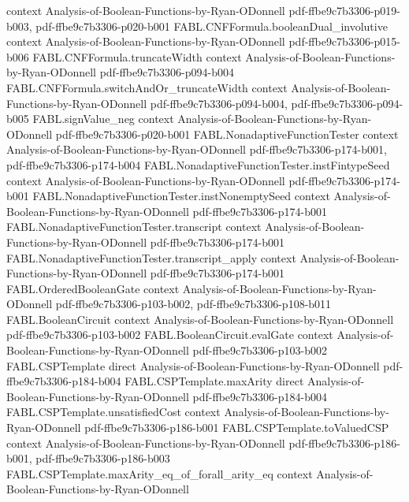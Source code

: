 \begin{theorem}
  {context}
  {Analysis-of-Boolean-Functions-by-Ryan-ODonnell}
  {pdf-ffbe9c7b3306-p019-b003,
    pdf-ffbe9c7b3306-p020-b001}
\proofstep
  {FABL.CNFFormula.booleanDual_involutive}
  {context}
  {Analysis-of-Boolean-Functions-by-Ryan-ODonnell}
  {pdf-ffbe9c7b3306-p015-b006}
\proofstep
  {FABL.CNFFormula.truncateWidth}
  {context}
  {Analysis-of-Boolean-Functions-by-Ryan-ODonnell}
  {pdf-ffbe9c7b3306-p094-b004}
\proofstep
  {FABL.CNFFormula.switchAndOr_truncateWidth}
  {context}
  {Analysis-of-Boolean-Functions-by-Ryan-ODonnell}
  {pdf-ffbe9c7b3306-p094-b004,
    pdf-ffbe9c7b3306-p094-b005}
\proofstep
  {FABL.signValue_neg}
  {context}
  {Analysis-of-Boolean-Functions-by-Ryan-ODonnell}
  {pdf-ffbe9c7b3306-p020-b001}
\proofstep
  {FABL.NonadaptiveFunctionTester}
  {context}
  {Analysis-of-Boolean-Functions-by-Ryan-ODonnell}
  {pdf-ffbe9c7b3306-p174-b001,
    pdf-ffbe9c7b3306-p174-b004}
\proofstep
  {FABL.NonadaptiveFunctionTester.instFintypeSeed}
  {context}
  {Analysis-of-Boolean-Functions-by-Ryan-ODonnell}
  {pdf-ffbe9c7b3306-p174-b001}
\proofstep
  {FABL.NonadaptiveFunctionTester.instNonemptySeed}
  {context}
  {Analysis-of-Boolean-Functions-by-Ryan-ODonnell}
  {pdf-ffbe9c7b3306-p174-b001}
\proofstep
  {FABL.NonadaptiveFunctionTester.transcript}
  {context}
  {Analysis-of-Boolean-Functions-by-Ryan-ODonnell}
  {pdf-ffbe9c7b3306-p174-b001}
\proofstep
  {FABL.NonadaptiveFunctionTester.transcript_apply}
  {context}
  {Analysis-of-Boolean-Functions-by-Ryan-ODonnell}
  {pdf-ffbe9c7b3306-p174-b001}
\proofstep
  {FABL.OrderedBooleanGate}
  {context}
  {Analysis-of-Boolean-Functions-by-Ryan-ODonnell}
  {pdf-ffbe9c7b3306-p103-b002,
    pdf-ffbe9c7b3306-p108-b011}
\proofstep
  {FABL.BooleanCircuit}
  {context}
  {Analysis-of-Boolean-Functions-by-Ryan-ODonnell}
  {pdf-ffbe9c7b3306-p103-b002}
\proofstep
  {FABL.BooleanCircuit.evalGate}
  {context}
  {Analysis-of-Boolean-Functions-by-Ryan-ODonnell}
  {pdf-ffbe9c7b3306-p103-b002}
\proofstep
  {FABL.CSPTemplate}
  {direct}
  {Analysis-of-Boolean-Functions-by-Ryan-ODonnell}
  {pdf-ffbe9c7b3306-p184-b004}
\proofstep
  {FABL.CSPTemplate.maxArity}
  {direct}
  {Analysis-of-Boolean-Functions-by-Ryan-ODonnell}
  {pdf-ffbe9c7b3306-p184-b004}
\proofstep
  {FABL.CSPTemplate.unsatisfiedCost}
  {context}
  {Analysis-of-Boolean-Functions-by-Ryan-ODonnell}
  {pdf-ffbe9c7b3306-p186-b001}
\proofstep
  {FABL.CSPTemplate.toValuedCSP}
  {context}
  {Analysis-of-Boolean-Functions-by-Ryan-ODonnell}
  {pdf-ffbe9c7b3306-p186-b001,
    pdf-ffbe9c7b3306-p186-b003}
\proofstep
  {FABL.CSPTemplate.maxArity_eq_of_forall_arity_eq}
  {context}
  {Analysis-of-Boolean-Functions-by-Ryan-ODonnell}

\end{theorem}
